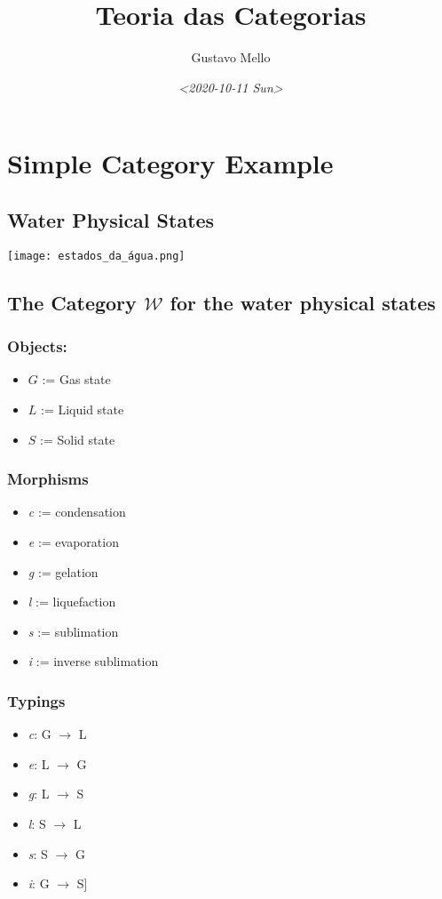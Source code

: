 \documentclass[11pt]{article}
\author{Gustavo Mello}
\date{\textit{<2020-10-11 Sun>}}
\title{Teoria das Categorias}
\begin{document}
\maketitle

\section{Simple Category Example}
\label{sec:orgbda18b0}
\subsection{Water Physical States}
\label{sec:orgaf49237}
\begin{center}
\texttt{[image: estados\_da\_água.png]}
\end{center}

\subsection{The Category \(\mathcal{W}\) for the water physical states}
\label{sec:org876f238}
\subsubsection{Objects:}
\label{sec:org4e4f325}
\begin{itemize}
\item \(G\) := Gas state
\item \(L\) := Liquid state
\item \(S\) := Solid state
\end{itemize}

\subsubsection{Morphisms}
\label{sec:orgf860bab}
\begin{itemize}
\item \emph{c} := condensation
\item \emph{e} := evaporation
\item \emph{g} := gelation
\item \emph{l} := liquefaction
\item \emph{s} := sublimation
\item \emph{i} := inverse sublimation
\end{itemize}

\subsubsection{Typings}
\label{sec:orgd839505}
\begin{itemize}
\item \emph{c}: G \(\to\) L
\item \emph{e}: L \(\to\) G
\item \emph{g}: L \(\to\) S
\item \emph{l}: S \(\to\) L
\item \emph{s}: S \(\to\) G
\item \emph{i}: G \(\to\) S]
\end{itemize}
\end{document}
